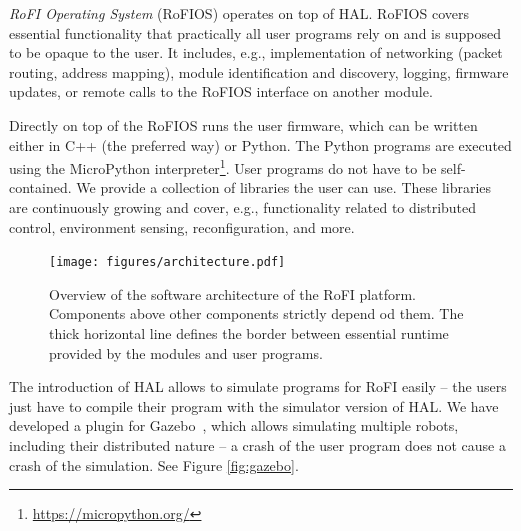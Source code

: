 \emph{RoFI Operating System} (RoFIOS) operates on top of HAL. RoFIOS covers
essential functionality that practically all user programs rely on and is
supposed to be opaque to the user. It includes, e.g., implementation of
networking (packet routing, address mapping), module identification and
discovery, logging, firmware updates, or remote calls to the RoFIOS interface on
another module.

Directly on top of the RoFIOS runs the user firmware, which can be written
either in C++ (the preferred way) or Python. The Python programs are executed
using the MicroPython interpreter\footnote{\url{https://micropython.org/}}. User
programs do not have to be self-contained. We provide a collection of libraries
the user can use. These libraries are continuously growing and cover, e.g.,
functionality related to distributed control, environment sensing,
reconfiguration, and more.

\begin{figure}[t]
   \centering
   \texttt{[image: figures/architecture.pdf]}
   \caption{Overview of the software architecture of the RoFI platform.
   Components above other components strictly depend od them. The thick
   horizontal line defines the border between essential runtime provided by the
   modules and user programs.}
   \label{fig:architecture}
\end{figure}

The introduction of HAL allows to simulate programs for RoFI easily -- the users
just have to compile their program with the simulator version of HAL. We have
developed a plugin for Gazebo~\cite{Gazebo}, which allows simulating multiple
robots, including their distributed nature -- a crash of the user program does
not cause a crash of the simulation. See Figure \ref{fig:gazebo}.

